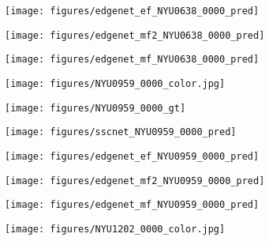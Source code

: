 \begin{figure*}[ht]
\begin{subfigure}{0.16\textwidth}
\end{subfigure}
\begin{subfigure}{0.16\textwidth}
\texttt{[image: figures/edgenet\_ef\_NYU0638\_0000\_pred]}

\end{subfigure}
\begin{subfigure}{0.16\textwidth}
\texttt{[image: figures/edgenet\_mf2\_NYU0638\_0000\_pred]}

\end{subfigure}
\begin{subfigure}{0.16\textwidth}
\texttt{[image: figures/edgenet\_mf\_NYU0638\_0000\_pred]}

\end{subfigure}



\begin{subfigure}{0.16\textwidth}
\texttt{[image: figures/NYU0959\_0000\_color.jpg]}

\end{subfigure}
\begin{subfigure}{0.16\textwidth}
\texttt{[image: figures/NYU0959\_0000\_gt]}
\end{subfigure}
\begin{subfigure}{0.16\textwidth}
\texttt{[image: figures/sscnet\_NYU0959\_0000\_pred]}

\end{subfigure}
\begin{subfigure}{0.16\textwidth}
\texttt{[image: figures/edgenet\_ef\_NYU0959\_0000\_pred]}

\end{subfigure}
\begin{subfigure}{0.16\textwidth}
\texttt{[image: figures/edgenet\_mf2\_NYU0959\_0000\_pred]}

\end{subfigure}
\begin{subfigure}{0.16\textwidth}
\texttt{[image: figures/edgenet\_mf\_NYU0959\_0000\_pred]}

\end{subfigure}



\begin{subfigure}{0.16\textwidth}
\texttt{[image: figures/NYU1202\_0000\_color.jpg]}


\end{subfigure}
\end{figure*}
